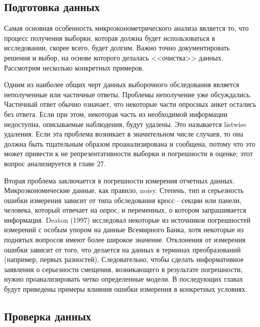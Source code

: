 \subsection{Подготовка данных}

Самая основная особенность микроэконометрического анализа является то, что процесс получения выборки, которая должна будет использоваться в исследовании, скорее всего, будет долгим. Важно точно документировать решения и выбор, на основе которого делалась <<очистка>> данных. Рассмотрим несколько конкретных примеров.


Одним из наиболее общих черт данных выборочного обследования является неполученные или частичные ответы. Проблемы неполучение уже обсуждались. Частичный ответ обычно означает, что некоторые части опросных анкет остались без ответа. Если при этом, некоторая часть из необходимой информации недоступна, описываемые наблюдения, будут удалены. Это называется listwise удаления. Если эта проблема возникает в значительном числе случаев, то она должна быть тщательным образом проанализирована и сообщена, потому что это может привести к не репрезентативности выборки и погрешности в оценке; этот вопрос анализируется в главе 27. 


Вторая проблема заключается в погрешности измерения отчетных данных. Микроэкономические данные, как правило, noisy. Степень, тип и серьезность ошибки измерения зависит от типа обследования кросс---секции или панели, человека, который отвечает на опрос, и переменных, о котором запрашивается информация. Deaton (1997) исследовал некоторые из источников погрешностей измерений с особым упором на данные Всемирного Банка, хотя некоторые из поднятых вопросов имеют более широкое значение. Отклонения от измерения ошибки зависит от того, что делается на данных в терминах преобразований (например, первых разностей). Следовательно, чтобы сделать информативное заявления о серьезности смещения, возникающего в результате погрешности, нужно проанализировать четко определенные модели. В последующих главах будут приведены примеры влияния ошибки измерения в конкретных условиях.


\subsection{Проверка данных}

